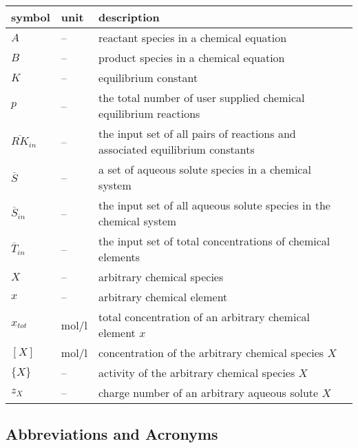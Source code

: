 \documentclass[12pt]{article}
\begin{document}
\renewcommand{\arraystretch}{1.2}
\noindent \begin{longtable*}{l l p{12cm}} \toprule
\textbf{symbol} & \textbf{unit} & \textbf{description}\\
\midrule 
$A$ & -- & reactant species in a chemical equation
\\
$B$ & -- & product species in a chemical equation
\\ 
$K$ & -- & equilibrium constant
\\ 
$p$ & -- & the total number of user supplied chemical equilibrium reactions
\\ 
$\overline {RK}_{in}$ & -- & the input set of all pairs of reactions and associated equilibrium constants 
\\ 
$\overline S$ & -- & a set of aqueous solute species in a chemical system
\\ 
$\overline S_{in}$ & -- & the input set of all aqueous solute species in the chemical system
\\ 
$\overline T_{in}$ & -- & the input set of total concentrations of chemical elements
\\ 
$X$ & -- & arbitrary chemical species
\\
$x$ & -- & arbitrary chemical element
\\
$x_{tot}$ & \si[per-mode=symbol] {\mole\per\litre} & total concentration of an arbitrary chemical element $x$
\\
$[X]$ & \si[per-mode=symbol] {\mole\per\litre} & concentration of the arbitrary chemical species $X$
\\
$\{X\}$ & -- & activity of the arbitrary chemical species $X$
\\
$z_{X}$ & -- & charge number of an arbitrary aqueous solute $X$
\\
\bottomrule
\end{longtable*}


\subsection{Abbreviations and Acronyms}
\end{document}
